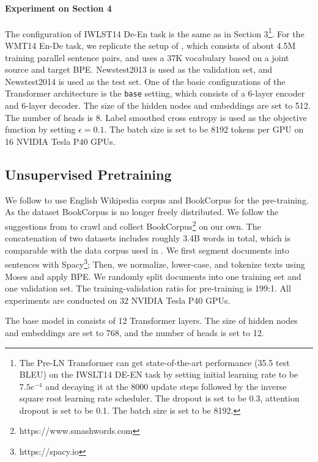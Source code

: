 \documentclass{article}
\begin{document}
\paragraph{Experiment on Section 4}
The configuration of IWLST14 De-En task is the same as in Section 3\footnote{The Pre-LN Transformer can get state-of-the-art performance (35.5 test BLEU) on the IWSLT14 DE-EN task by setting initial learning rate to be $7.5e^{-4}$ and decaying it at the 8000 update steps followed by the inverse square root learning rate scheduler. The dropout is set to be 0.3, attention dropout is set to be 0.1. The batch size is set to be 8192.}.
For the WMT14 En-De task, we replicate the setup of \citep{vaswani2017attention}, which consists of about 4.5M training parallel sentence pairs, and uses a 37K vocabulary based on a joint source and target BPE. Newstest2013 is used as the validation set, and Newstest2014 is used as the test set. One of the basic configurations of the Transformer architecture is the \texttt{base} setting, which consists of a 6-layer encoder and 6-layer decoder. The size of the hidden nodes and embeddings are set to 512. The number of heads is 8. Label smoothed cross entropy is used as the objective function by setting $\epsilon= 0.1$. The batch size is set to be 8192 tokens per GPU on 16 NVIDIA Tesla P40 GPUs.

\subsection{Unsupervised Pretraining}

We follow \citet{devlin2018bert} to use English Wikipedia corpus and BookCorpus for the pre-training. As the dataset BookCorpus \citep{moviebook} is no longer freely distributed. We follow the suggestions from \citet{devlin2018bert} to crawl and collect BookCorpus\footnote{https://www.smashwords.com} on our own. The concatenation of two datasets includes roughly 3.4B words in total, which is comparable with the data corpus used in \citet{devlin2018bert}. We first segment documents into sentences with Spacy\footnote{https://spacy.io}; Then, we normalize, lower-case, and tokenize texts using Moses \citep{koehn2007moses} and apply BPE\citep{BPE}. We randomly split documents into one training set and one validation set. The training-validation ratio for pre-training is 199:1. All experiments are conducted on 32 NVIDIA Tesla P40 GPUs.

The base model in \citet{devlin2018bert} consists of 12 Transformer layers. The size of hidden nodes and embeddings are set to 768, and the number of heads is set to 12. 
\end{document}
